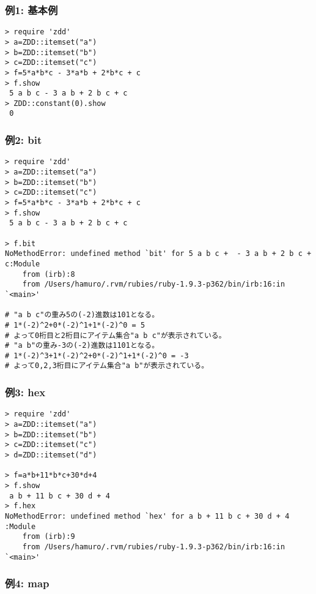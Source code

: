 \subsubsection*{例1: 基本例}



\begin{Verbatim}[baselinestretch=0.7,frame=single]
> require 'zdd'
> a=ZDD::itemset("a")
> b=ZDD::itemset("b")
> c=ZDD::itemset("c")
> f=5*a*b*c - 3*a*b + 2*b*c + c
> f.show
 5 a b c - 3 a b + 2 b c + c
> ZDD::constant(0).show
 0
\end{Verbatim}
\subsubsection*{例2: bit}



\begin{Verbatim}[baselinestretch=0.7,frame=single]
> require 'zdd'
> a=ZDD::itemset("a")
> b=ZDD::itemset("b")
> c=ZDD::itemset("c")
> f=5*a*b*c - 3*a*b + 2*b*c + c
> f.show
 5 a b c - 3 a b + 2 b c + c

> f.bit
NoMethodError: undefined method `bit' for 5 a b c +  - 3 a b + 2 b c + c:Module
	from (irb):8
	from /Users/hamuro/.rvm/rubies/ruby-1.9.3-p362/bin/irb:16:in `<main>'

# "a b c"の重み5の(-2)進数は101となる。
# 1*(-2)^2+0*(-2)^1+1*(-2)^0 = 5
# よって0桁目と2桁目にアイテム集合"a b c"が表示されている。
# "a b"の重み-3の(-2)進数は1101となる。
# 1*(-2)^3+1*(-2)^2+0*(-2)^1+1*(-2)^0 = -3
# よって0,2,3桁目にアイテム集合"a b"が表示されている。

\end{Verbatim}
\subsubsection*{例3: hex}



\begin{Verbatim}[baselinestretch=0.7,frame=single]
> require 'zdd'
> a=ZDD::itemset("a")
> b=ZDD::itemset("b")
> c=ZDD::itemset("c")
> d=ZDD::itemset("d")

> f=a*b+11*b*c+30*d+4
> f.show
 a b + 11 b c + 30 d + 4
> f.hex
NoMethodError: undefined method `hex' for a b + 11 b c + 30 d + 4 :Module
	from (irb):9
	from /Users/hamuro/.rvm/rubies/ruby-1.9.3-p362/bin/irb:16:in `<main>'
\end{Verbatim}
\subsubsection*{例4: map}



